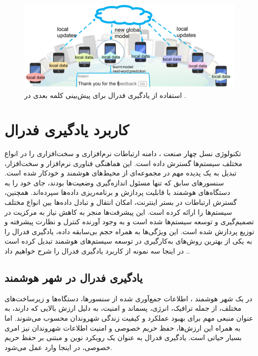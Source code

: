  \begin{figure}[t]
	\centering
	\includegraphics[scale=1]{images/chap1/gboard.png}%
	\caption{%
استفاده از یادگیری فدرال برای پیش‌بینی کلمه بعدی در
		\cite{li2020federated}%
		.
	}
	\label{gboard}
	\centering
\end{figure}


\section{کاربرد یادگیری فدرال}
تکنولوژی نسل چهار صنعت%
%
، دامنه ارتباطات نرم‌افزاری و سخت‌افزاری را در انواع مختلف سیستم‌ها گسترش داده است. این هماهنگی فناوری نرم‌افزار و سخت‌افزار، تبدیل به یک پدیده مهم در مجموعه‌ای از محیط‌های هوشمند و خودکار شده است. سنسورهای سابق که تنها مسئول اندازه‌گیری وضعیت‌ها بودند، جای خود را به دستگاه‌های هوشمند با قابلیت پردازش و برنامه‌ریزی داده‌ها سپرده‌اند. همچنین، گسترش ارتباطات در بستر اینترنت، امکان انتقال و تبادل داده‌ها بین انواع مختلف سیستم‌ها را ارائه کرده است. این پیشرفت‌ها منجر به کاهش نیاز به مرکزیت در تصمیم‌گیری و توسعه سیستم‌ها شده است و به وجود آورنده کنترل و نظارت پیشرفته و توزیع پردازش شده است. این ویژگی‌ها به همراه حجم بی‌سابقه‌ داده، یادگیری فدرال را به یکی از بهترین روش‌های به‌کارگیری در توسعه سیستم‌های هوشمند تبدیل کرده است
\cite{mahtab2022algorithm}%
. در اینجا سه نمونه از کاربرد یادگیری فدرال را شرح خواهیم داد.


\subsection{یادگیری فدرال در شهر هوشمند}
در یک شهر هوشمند%
%
، اطلاعات جمع‌آوری شده از سنسورها، دستگاه‌ها و زیرساخت‌های مختلف، از جمله ترافیک، انرژی، پسماند و امنیت، به دلیل ارزش بالایی که دارند، به عنوان منبعی مهم برای بهبود عملکرد و کیفیت زندگی شهروندان محسوب می‌شوند. اما به همراه این ارزش‌ها، حفظ حریم خصوصی و امنیت اطلاعات شهروندان نیز امری بسیار حیاتی است. یادگیری فدرال به عنوان یک رویکرد نوین و مبتنی بر حفظ حریم خصوصی، در اینجا وارد عمل می‌شود.

